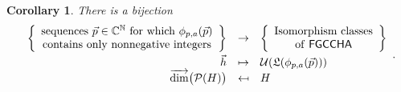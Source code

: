 \documentclass[11pt]{amsart}
\newtheorem{corollary}[theorem]{Corollary}
\theoremstyle{definition}
\numberwithin{equation}{section}
\def\NN{{\mathbb N}}
\def\CC{{\mathbb C}}
\newcommand{\FGCCHA}{\textsf{FGCCHA}\xspace}
\newcommand{\vecdim}{\overrightarrow{\dim}}
\begin{document}
\begin{corollary}
\label{prop:UniqueBySequence}
There is a bijection
\[
\begin{array}{rcl}
\left\{ \begin{array}{c} \text{sequences $\vec{p} \in \CC^{\NN}$ for which $\phi_{p,a}(\vec{p})$} \\ \text{contains only nonnegative integers} \end{array} \right\} & \to & \left\{ \begin{array}{c} \text{Isomorphism classes} \\ \text{of \FGCCHA} \end{array} \right\} \\[2ex]
\vec{h} & \mapsto & \mathcal{U}(\mathfrak{L}(\phi_{p,a}(\vec{p}))) \\
\vecdim\big(\mathcal{P}(H)\big) & \mapsfrom & H
\end{array}.
\]
\end{corollary}
\end{document}
